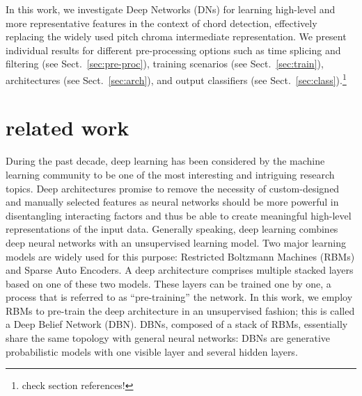 \documentclass{article}
\begin{document}
In this work, we investigate Deep Networks (DNs) for learning high-level and more representative features in the context of chord detection, effectively replacing the widely used pitch chroma intermediate representation. 
We present individual results for different pre-processing options such as time splicing and filtering (see Sect.~\ref{sec:pre-proc}), training scenarios (see Sect.~\ref{sec:train}), architectures (see Sect.~\ref{sec:arch}), and output classifiers (see Sect.~\ref{sec:class}).\footnote{check section references!} %

%


\section{related work}
During the past decade, deep learning has been considered by the machine learning community to be one of the most interesting and intriguing research topics. Deep architectures promise to remove the necessity of custom-designed and manually selected features as neural networks should be more powerful in disentangling interacting factors and thus be able to create meaningful high-level representations of the input data. Generally speaking, deep learning combines deep neural networks with an unsupervised learning model. Two major learning models are widely used for this purpose: Restricted Boltzmann Machines (RBMs) and Sparse Auto Encoders. A deep architecture comprises multiple stacked layers based on one of these two models. These layers can be trained one by one, a process that is referred to as ``pre-training'' the network. In this work, we employ RBMs to pre-train the deep architecture in an unsupervised fashion; this is called a Deep Belief Network (DBN). DBNs, composed of a stack of RBMs, essentially share the same topology with general neural networks: DBNs are generative probabilistic models with one visible layer and several hidden layers.\cite{hinton2006fast}
 
\end{document}
